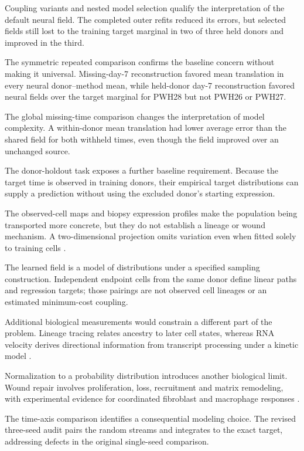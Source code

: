 \documentclass[10pt,a4paper]{article}
\begin{document}
Coupling variants and nested model selection qualify the interpretation of the default neural field. The completed outer refits reduced its errors, but selected fields still lost to the training target marginal in two of three held donors and improved in the third.

The symmetric repeated comparison confirms the baseline concern without making it universal. Missing-day-7 reconstruction favored mean translation in every neural donor--method mean, while held-donor day-7 reconstruction favored neural fields over the target marginal for PWH28 but not PWH26 or PWH27.

The global missing-time comparison changes the interpretation of model complexity. A within-donor mean translation had lower average error than the shared field for both withheld times, even though the field improved over an unchanged source.

The donor-holdout task exposes a further baseline requirement. Because the target time is observed in training donors, their empirical target distributions can supply a prediction without using the excluded donor's starting expression.

The observed-cell maps and biopsy expression profiles make the population being transported more concrete, but they do not establish a lineage or wound mechanism. A two-dimensional projection omits variation even when fitted solely to training cells \citep{huang2022visualization}.

The learned field is a model of distributions under a specified sampling construction. Independent endpoint cells from the same donor define linear paths and regression targets; those pairings are not observed cell lineages or an estimated minimum-cost coupling.

Additional biological measurements would constrain a different part of the problem. Lineage tracing relates ancestry to later cell states, whereas RNA velocity derives directional information from transcript processing under a kinetic model \citep{weinreb2020,lamanno2018,bergen2020}.

Normalization to a probability distribution introduces another biological limit. Wound repair involves proliferation, loss, recruitment and matrix remodeling, with experimental evidence for coordinated fibroblast and macrophage responses \citep{rognoni2018,shook2018}.

The time-axis comparison identifies a consequential modeling choice. The revised three-seed audit pairs the random streams and integrates to the exact target, addressing defects in the original single-seed comparison.
\end{document}
